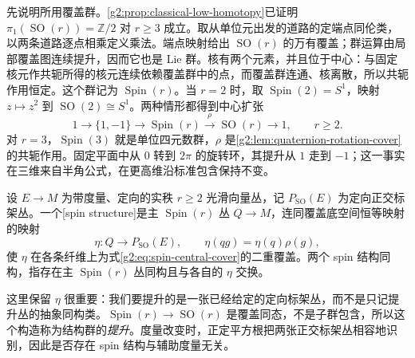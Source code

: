\ProseParagraphBreak

先说明所用覆盖群。\cref{g2:prop:classical-low-homotopy}已证明 \(\pi_1(\operatorname{SO}(r))=\mathbb Z/2\) 对 \(r\ge3\) 成立。取从单位元出发的道路的定端点同伦类，以两条道路逐点相乘定义乘法。端点映射给出 \(\operatorname{SO}(r)\) 的万有覆盖；群运算由局部覆盖图连续提升，因而它也是 Lie 群。核有两个元素，并且位于中心：与固定核元作共轭所得的核元连续依赖覆盖群中的点，而覆盖群连通、核离散，所以共轭作用恒定。这个群记为 \(\operatorname{Spin}(r)\)。当 \(r=2\) 时，取 \(\operatorname{Spin}(2)=S^1\)，映射 \(z\mapsto z^2\) 到 \(\operatorname{SO}(2)\cong S^1\)。两种情形都得到中心扩张
\begin{equation}\label{g2:eq:spin-central-cover}
	1\longrightarrow\{1,-1\}\longrightarrow\operatorname{Spin}(r)
	\xrightarrow{\rho}\operatorname{SO}(r)\longrightarrow1,
	\qquad r\ge2.
\end{equation}
对 \(r=3\)，\(\operatorname{Spin}(3)\) 就是单位四元数群，\(\rho\) 是\cref{g2:lem:quaternion-rotation-cover}的共轭作用。固定平面中从 \(0\) 转到 \(2\pi\) 的旋转环，其提升从 \(1\) 走到 \(-1\)；这一事实在三维来自半角公式，在更高维沿标准包含保持不变。

\begin{definition}\label{g2:def:spin-structure}
	设 \(E\to M\) 为带度量、定向的实秩 \(r\ge2\) 光滑向量丛，记 \(P_{\operatorname{SO}}(E)\) 为定向正交标架丛。一个[spin structure]是主 \(\operatorname{Spin}(r)\) 丛 \(Q\to M\)，连同覆盖底空间恒等映射的映射
	\[
		\eta:Q\longrightarrow P_{\operatorname{SO}}(E),\qquad
		\eta(qg)=\eta(q)\rho(g),
	\]
	使 \(\eta\) 在各条纤维上为式\eqref{g2:eq:spin-central-cover}的二重覆盖。两个 spin 结构同构，指存在主 \(\operatorname{Spin}(r)\) 丛同构且与各自的 \(\eta\) 交换。
\end{definition}

这里保留 \(\eta\) 很重要：我们要提升的是一张已经给定的定向标架丛，而不是只记提升丛的抽象同构类。\(\operatorname{Spin}(r)\to\operatorname{SO}(r)\) 是覆盖同态，不是子群包含，所以这个构造称为结构群的\emph{提升}。度量改变时，正定平方根把两张正交标架丛相容地识别，因此是否存在 spin 结构与辅助度量无关。


